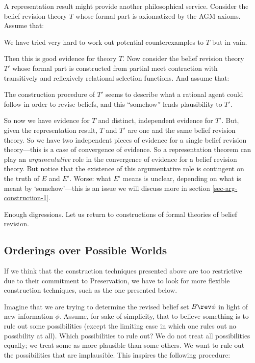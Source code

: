 A representation result might provide another philosophical service. Consider the belief revision theory $T$ whose formal part is axiomatized by the AGM axioms. Assume that: \op

	\im[($E$)] We have tried very hard to work out potential counterexamples to $T$ but in vain. 

\ed Then this is good evidence for theory $T$. Now consider the belief revision theory $T'$ whose formal part is constructed from partial meet contraction with transitively and reflexively relational selection functions. And assume that: \op

	\im[($E'$)] The construction procedure of $T'$ seems to describe what a rational agent could follow in order to revise beliefs, and this ``somehow'' lends plausibility to $T'$. 

\ed So now we have evidence for $T$ and distinct, independent evidence for $T'$. But, given the representation result, $T$ and $T'$ are one and the same belief revision theory. So we have two independent pieces of evidence for a single belief revision theory---this is a case of convergence of evidence. So a representation theorem can play an {\em argumentative} role in the convergence of evidence for a belief revision theory. But notice that the existence of this argumentative role is contingent on the truth of $E$ and $E'$. Worse: what $E'$ means is unclear, depending on what is meant by `somehow'---this is an issue we will discuss more in section \ref{sec-arg-construction-1}.

Enough digressions. Let us return to constructions of formal theories of belief revision.

\subsection{Orderings over Possible Worlds}\label{sec-ordering}

If we think that the construction techniques presented above are too restrictive due to their commitment to Preservation, we have to look for more flexible construction techniques, such as the one presented below. 

Imagine that we are trying to determine the revised belief set $B \rev \phi$ in light of new information $\phi$. Assume, for sake of simplicity, that to believe something is to rule out some possibilities (except the limiting case in which one rules out no possibility at all). Which possibilities to rule out? We do not treat all possibilities equally; we treat some as more plausible than some others. We want to rule out the possibilities that are implausible. This inspires the following procedure: \op

